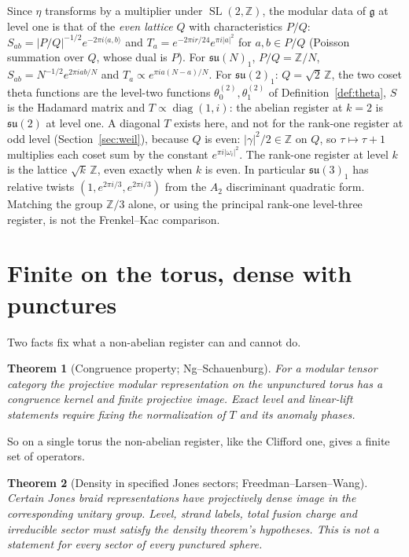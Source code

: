 \documentclass[11pt]{article}
\newtheorem{theorem}{Theorem}[section]
\theoremstyle{definition}
\theoremstyle{remark}
\newcommand{\Z}{\mathbb{Z}}
\newcommand{\SL}{\operatorname{SL}}
\begin{document}
Since $\eta$ transforms by a multiplier under $\SL(2,\Z)$, the modular
data of $\mathfrak g$ at level one is that of the \emph{even lattice} $Q$
with characteristics $P/Q$:
$S_{ab} = |P/Q|^{-1/2}e^{-2\pi i\langle a,b\rangle}$ and
$T_a = e^{-2\pi ir/24}e^{\pi i|a|^2}$ for $a,b\in P/Q$ (Poisson summation
over $Q$, whose dual is $P$). For $\mathfrak{su}(N)_1$, $P/Q = \Z/N$,
$S_{ab} = N^{-1/2}e^{2\pi iab/N}$ and $T_a\propto e^{\pi ia(N-a)/N}$. For
$\mathfrak{su}(2)_1$: $Q = \sqrt2\,\Z$, the two coset theta functions are
the level-two functions $\theta^{(2)}_0,\theta^{(2)}_1$ of
Definition~\ref{def:theta}, $S$ is the Hadamard matrix and
$T\propto\operatorname{diag}(1,i)$: the abelian register at $k = 2$ is
$\mathfrak{su}(2)$ at level one. A diagonal $T$ exists here, and not for
the rank-one register at odd level (Section~\ref{sec:weil}), because $Q$
is even: $|\gamma|^2/2\in\Z$ on $Q$, so $\tau\mapsto\tau+1$ multiplies each
coset sum by the constant $e^{\pi i|\omega_i|^2}$. The rank-one register
at level $k$ is the lattice $\sqrt k\,\Z$, even exactly when $k$ is even.
In particular $\mathfrak{su}(3)_1$ has relative twists
$(1,e^{2\pi i/3},e^{2\pi i/3})$ from the $A_2$ discriminant quadratic
form. Matching the group $\Z/3$ alone, or using the principal rank-one
level-three register, is not the Frenkel--Kac comparison.

\section{Finite on the torus, dense with punctures}\label{sec:density}

Two facts fix what a non-abelian register can and cannot do.

\begin{theorem}[Congruence property; Ng--Schauenburg]
For a modular tensor category the projective modular representation on the
unpunctured torus has a congruence kernel and finite projective image.
Exact level and linear-lift statements require fixing the normalization
of $T$ and its anomaly phases.
\end{theorem}

So on a single torus the non-abelian register, like the Clifford one, gives
a finite set of operators.

\begin{theorem}[Density in specified Jones sectors; Freedman--Larsen--Wang]
Certain Jones braid representations have projectively dense image in the
corresponding unitary group. Level, strand labels, total fusion charge and
irreducible sector must satisfy the density theorem's hypotheses.
This is not a statement for every sector of every punctured sphere.
\end{theorem}
\end{document}
